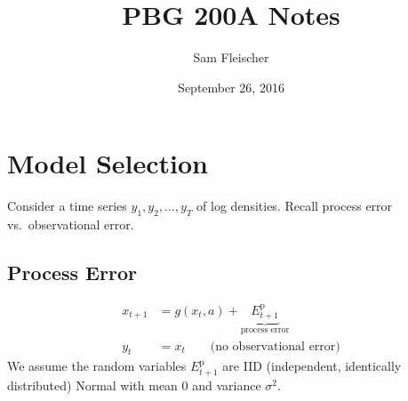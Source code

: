 \documentclass{article}
\title{PBG 200A Notes}
\author{Sam Fleischer}
\date{September 26, 2016}
\begin{document}
    \maketitle

    \section{Model Selection}

        Consider a time series $y_1, y_2, \dots, y_T$ of log densities.  Recall process error vs.~observational error.

        \subsection{Process Error}
            \begin{align}
                x_{t+1} &= g(x_t, a) + \underbrace{E_{t+1}^\text{p}}_{\text{process error}} \\
                y_t &= x_t \qquad \text{(no observational error)}
            \end{align}
            We assume the random variables $E_{t+1}^\text{p}$ are IID (independent, identically distributed) Normal with mean $0$ and variance $\sigma^2$.
\end{document}
